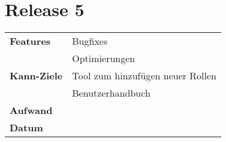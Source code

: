 \section*{Release 5}
\label{sec:release_5}

\begin{tabular}{p{5cm} p{9cm}}
    \textbf{Features} &  Bugfixes \\
    & Optimierungen \\
    \hline
    \textbf{Kann-Ziele} & Tool zum hinzufügen neuer Rollen \\
    & Benutzerhandbuch \\
    \hline
    \textbf{Aufwand} & \\
    \hline
    \textbf{Datum} & 
\end{tabular}